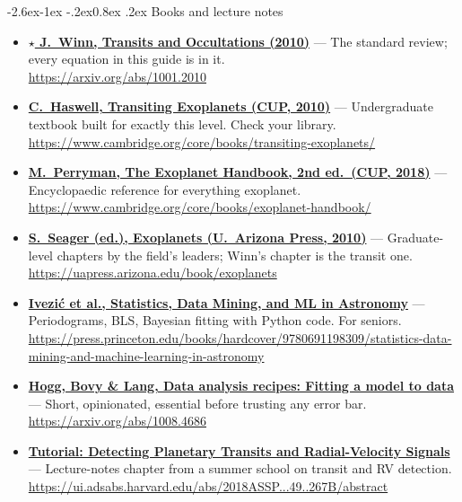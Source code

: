 \documentclass[11pt,a4paper]{article}
\makeatletter
\renewcommand\subsection{\@startsection{subsection}{2}{\z@}%
  {-2.6ex\@plus -1ex \@minus -.2ex}{0.8ex \@plus .2ex}%
  {\normalfont\sffamily\Large\bfseries\color{navy}}}
\newcommand{\res}[3]{\item \textbf{\href{#2}{#1}} --- #3\\[-1pt]{\scriptsize\color{gray}\url{#2}}}
\newenvironment{reslist}{\begin{itemize}\setlength{\itemsep}{5pt}}{\end{itemize}}
\makeatother
\begin{document}
\subsection{Books and lecture notes}
\begin{reslist}
\res{\(\star\) J.\ Winn, Transits and Occultations (2010)}{https://arxiv.org/abs/1001.2010}{The standard review; every equation in this guide is in it.}
\res{C.\ Haswell, Transiting Exoplanets (CUP, 2010)}{https://www.cambridge.org/core/books/transiting-exoplanets/}{Undergraduate textbook built for exactly this level. Check your library.}
\res{M.\ Perryman, The Exoplanet Handbook, 2nd ed.\ (CUP, 2018)}{https://www.cambridge.org/core/books/exoplanet-handbook/}{Encyclopaedic reference for everything exoplanet.}
\res{S.\ Seager (ed.), Exoplanets (U.\ Arizona Press, 2010)}{https://uapress.arizona.edu/book/exoplanets}{Graduate-level chapters by the field's leaders; Winn's chapter is the transit one.}
\res{Ivezi\'c et al., Statistics, Data Mining, and ML in Astronomy}{https://press.princeton.edu/books/hardcover/9780691198309/statistics-data-mining-and-machine-learning-in-astronomy}{Periodograms, BLS, Bayesian fitting with Python code. For seniors.}
\res{Hogg, Bovy \& Lang, Data analysis recipes: Fitting a model to data}{https://arxiv.org/abs/1008.4686}{Short, opinionated, essential before trusting any error bar.}
\res{Tutorial: Detecting Planetary Transits and Radial-Velocity Signals}{https://ui.adsabs.harvard.edu/abs/2018ASSP...49..267B/abstract}{Lecture-notes chapter from a summer school on transit and RV detection.}
\end{reslist}
\end{document}
